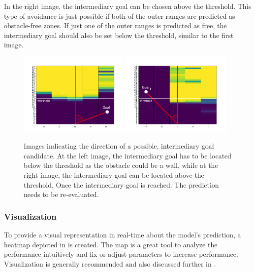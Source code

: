 In the right image, the intermediary goal can be chosen above the threshold. This type of avoidance is just possible if both of the outer ranges are predicted as obstacle-free zones. If just one of the outer ranges is predicted as free, the intermediary goal should also be set below the threshold, similar to the first image.



\begin{figure}[h]%
\centering
\includegraphics[width=0.48\textwidth]{Bilder/intermediary_goal_1.png} 
\hspace{0.2 cm}
\includegraphics[width=0.48\textwidth]{Bilder/intermediary_goal_2.png} 
\caption[]{Images indicating the direction of a possible, intermediary goal candidate. At the left image, the intermediary goal has to be located below the threshold as the obstacle could be a wall, while at the right image, the intermediary goal can be located above the threshold. Once the intermediary goal is reached. The prediction needs to be re-evaluated.}
\label{intermediary_goal}
\end{figure}
\newpage

\subsubsection{Visualization \label{visualization} }
To provide a visual representation in real-time about the model's prediction, a heatmap depicted in  is created. The map is a great tool to analyze the performance intuitively and fix or adjust parameters to increase performance. Visualization is generally recommended and also discussed further in .


